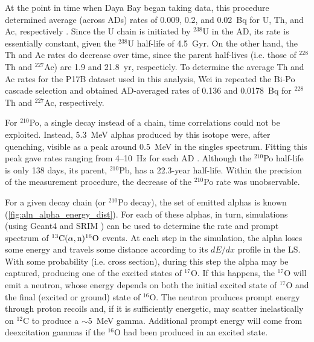 \documentclass[../thesis.tex]{subfiles}
\begin{document}
At the point in time when Daya Bay began taking data, this procedure determined average (across ADs) rates of 0.009, 0.2, and 0.02~Bq for U, Th, and Ac, respectively \cite{lianghongBkg}. Since the U chain is initiated by $^{238}$U in the AD, its rate is essentially constant, given the $^{238}$U half-life of 4.5~Gyr. On the other hand, the Th and Ac rates do decrease over time, since the parent half-lives (i.e. those of $^{228}$Th and $^{227}$Ac) are 1.9 and 21.8~yr, respectiely. To determine the average Th and Ac rates for the P17B dataset used in this analysis, Wei in \cite{lianghongBkg} repeated the Bi-Po cascade selection and obtained AD-averaged rates of 0.136 and 0.0178~Bq for $^{228}$Th and $^{227}$Ac, respectively.

For $^{210}$Po, a single decay instead of a chain, time correlations could not be exploited. Instead, 5.3~MeV alphas produced by this isotope were, after quenching, visible as a peak around 0.5~MeV in the singles spectrum. Fitting this peak gave rates ranging from 4--10~Hz for each AD \cite{zeyuanAln}. Although the $^{210}$Po half-life is only 138 days, its parent, $^{210}$Pb, has a 22.3-year half-life. Within the precision of the measurement procedure, the decrease of the $^{210}$Po rate was unobservable.

For a given decay chain (or $^{210}$Po decay), the set of emitted alphas is known (\autoref{fig:aln_alpha_energy_dist}). For each of these alphas, in turn, simulations (using Geant4 \cite{Geant4} and SRIM \cite{SRIM}) can be used to determine the rate and prompt spectrum of $^{13}\mathrm{C}(\alpha, \mathrm{n})^{16}\mathrm{O}$ events. At each step in the simulation, the alpha loses some energy and travels some distance according to its $dE/dx$ profile in the LS. With some probability (i.e. cross section), during this step the alpha may be captured, producing one of the excited states of $^{17}$O. If this happens, the $^{17}$O will emit a neutron, whose energy depends on both the initial excited state of $^{17}$O and the final (excited or ground) state of $^{16}$O. The neutron produces prompt energy through proton recoils and, if it is sufficiently energetic, may scatter inelastically on $^{12}$C to produce a $\sim$5~MeV gamma. Additional prompt energy will come from deexcitation gammas if the $^{16}$O had been produced in an excited state.
\end{document}
